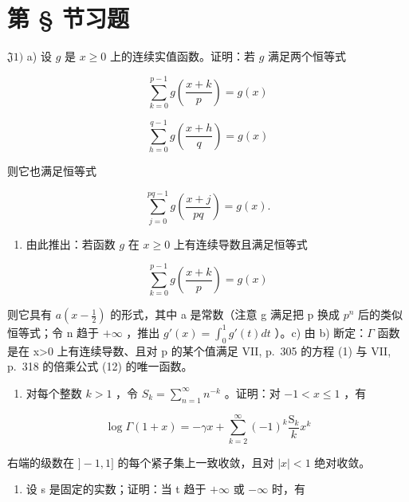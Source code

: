 \section*{第 \S{} 节习题}
{}

\(\mathfrak{J}1)\) a) 设 \(g\) 是 \(x \geqslant 0\) 上的连续实值函数。证明：若 \(g\) 满足两个恒等式

\[
\sum_ {k = 0} ^ {p - 1} g \left(\frac {x + k}{p}\right) = g (x)
\]

\[
\sum_ {h = 0} ^ {q - 1} g \left(\frac {x + h}{q}\right) = g (x)
\]

则它也满足恒等式

\[
\sum_ {j = 0} ^ {p q - 1} g \left(\frac {x + j}{p q}\right) = g (x).
\]

\begin{enumerate}
\def\labelenumi{\alph{enumi})}
\setcounter{enumi}{1}
\tightlist
\item
  由此推出：若函数 \(g\) 在 \(x \geqslant 0\) 上有连续导数且满足恒等式
\end{enumerate}

\[
\sum_ {k = 0} ^ {p - 1} g \left(\frac {x + k}{p}\right) = g (x)
\]

则它具有 \(a(x-\frac{1}{2})\) 的形式，其中 a 是常数（注意 g 满足把 p 换成 \(p^{n}\) 后的类似恒等式；令 n 趋于 \(+\infty\) ，推出 \(g'(x)=\int_{0}^{1}g'(t)dt\) ）。c) 由 b) 断定：\(\Gamma\) 函数是在 x\textgreater0 上有连续导数、且对 p 的某个值满足 VII, p.~305 的方程 (1) 与 VII, p.~318 的倍乘公式 (12) 的唯一函数。

\begin{enumerate}
\def\labelenumi{\arabic{enumi})}
\setcounter{enumi}{1}
\tightlist
\item
  对每个整数 \(k > 1\) ，令 \(S_k = \sum_{n=1}^{\infty} n^{-k}\) 。证明：对 \(-1 < x \leqslant 1\) ，有
\end{enumerate}

\[
\log \Gamma (1 + x) = - \gamma x + \sum_ {k = 2} ^ {\infty} (- 1) ^ {k} \frac {\mathrm{S} _ {k}}{k} x ^ {k}
\]

右端的级数在 \(]-1,1]\) 的每个紧子集上一致收敛，且对 \(|x|<1\) 绝对收敛。

\begin{enumerate}
\def\labelenumi{\arabic{enumi})}
\setcounter{enumi}{2}
\tightlist
\item
  设 s 是固定的实数；证明：当 t 趋于 \(+\infty\) 或 \(-\infty\) 时，有
\end{enumerate}

